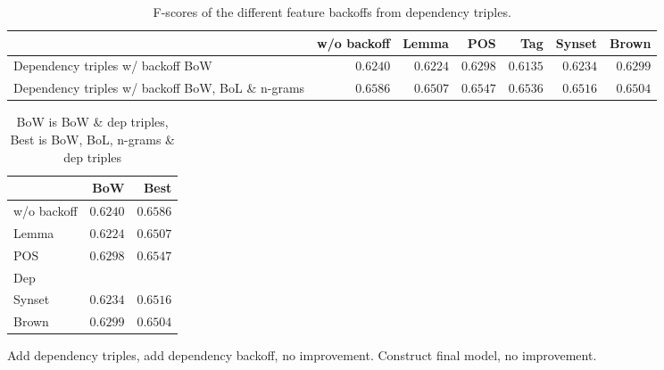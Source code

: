 \documentclass[11pt,letterpaper]{article}
\begin{document}
\begin{table*}
  \begin{center}
    \begin{tabular}{lrrrrrr}
      \toprule
      
      & w/o backoff & Lemma & POS & Tag & Synset & Brown\\
      \midrule
      Dependency triples w/ backoff  BoW & $0.6240$ &  $0.6224$ & $0.6298$ & $0.6135$ & $0.6234$ & $0.6299$  \\ %
      Dependency triples w/ backoff BoW, BoL \& n-grams & $0.6586$ & $0.6507$ & $0.6547$ & $0.6536$ & $0.6516$ & $0.6504$\\ %
      
      \bottomrule

    \end{tabular}
  \end{center}
  \caption{F-scores of the different feature backoffs from dependency triples.}
  \label{tab:firsttriplebackoff}
\end{table*}

\begin{table*}
  \begin{center}
    \begin{tabular}{lrr}
      \toprule
      
      
      & BoW & Best\\
      \midrule
      w/o backoff & $0.6240$ & $0.6586$ \\
      Lemma & $0.6224$ & $0.6507$ \\
      POS & $0.6298$ & $0.6547$ \\ %
      Dep \\
      Synset & $0.6234$ & $0.6516$  \\ %
      Brown & $0.6299$ & $0.6504$ \\ %
      
      
      
      \bottomrule

    \end{tabular}
  \end{center}
  \caption{BoW is BoW \& dep triples, Best is BoW, BoL, n-grams \& dep triples}
  \label{tab:firsttriplebackoff}
\end{table*}

Add dependency triples, add dependency backoff, no improvement. Construct final model, no improvement.
\end{document}
